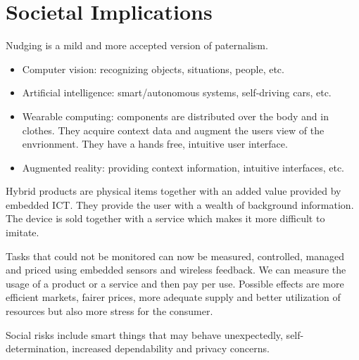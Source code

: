 \section{Societal Implications}
\begin{mytitle}[Nudging] Nudging is a mild and more accepted version of paternalism.
\end{mytitle}
\begin{mytitle}\hfill
\begin{itemize}
    \item Computer vision: recognizing objects, situations, people, etc.
    \item Artificial intelligence: smart/autonomous systems, self-driving cars, etc.
    \item Wearable computing: components are distributed over the body and in clothes. They acquire context data and augment the users view of the envrionment. They have a hands free, intuitive user interface.
    \item Augmented reality: providing context information, intuitive interfaces, etc.
\end{itemize}
\end{mytitle}
\begin{mytitle} Hybrid products are physical items together with an added value provided by embedded ICT. They provide the user with a wealth of background information. The device is sold together with a service which makes it more difficult to imitate.
\end{mytitle}
\begin{mytitle} Tasks that could not be monitored can now be measured, controlled, managed and priced using embedded sensors and wireless feedback. We can measure the usage of a product or a service and then pay per use. Possible effects are more efficient markets, fairer prices, more adequate supply and better utilization of resources but also more stress for the consumer.
\end{mytitle}
\begin{mytitle} Social risks include smart things that may behave unexpectedly, self-determination, increased dependability and privacy concerns.
\end{mytitle}